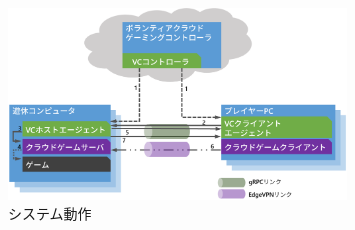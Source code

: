 \begin{figure}[t]
    \centering
    \includegraphics[width=0.8\textwidth,keepaspectratio,clip]{img/sequence.eps}
    \caption{システム動作}
    \label{fig:seq}
\end{figure}
